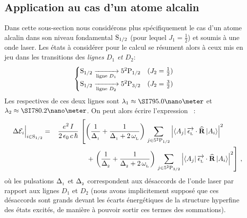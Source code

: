 \subsection{Application au cas d'un atome alcalin}
Dans cette sous-section nous considérons plus spécifiquement 
le cas d'un atome alcalin dans son niveau fondamental ${{{\rm S}_{{1}/{2}}}}$ (pour lequel $J_1=\tfrac{1}{2}$) et soumis à une onde laser.
Les états à considérer pour le calcul se résument alors à ceux mis en jeu dans les transitions des \emph{lignes $D_1$ et $D_2$}:
\[
\begin{cases}
{\ensuremath{{\rm S}_{{1}/{2}}}}\xrightarrow[\text{ligne $D_1$}]{}{5^2 {\rm P}_{{1}/{2}}} 
 \text{~~ ($J_2=\tfrac{1}{2}$)} 
 \\
{{\rm S}_{{1}/{2}}}\xrightarrow[\text{ligne $D_2$}]{}{5^2 {\rm P}_{{3}/{2}}} 
 \text{~~ ($J_2=\tfrac{3}{2}$)} 
\end{cases}
\]
Les \los respectives de ces deux lignes sont $\LO_1\approx\nm{795.0}$ et $\LO_2\approx\nm{780.2}$. 
On peut alors écrire l'expression~ :
\[
\begin{split}
	\Avec{\Delta \Ener_i}{i \in \OrbitalSJ} = \,\,\,\,\,
	\frac{e^2\,I}{2\,\epsilon_0\,c\,\hbar}\,
	&\left[
	\left(\dfrac{1
	}{\desacU}
	+\dfrac{1
	}{\desacU + 2\,\pulsLaser}
	\right)
	\,\sum_{j \in \OrbitalPJun} 
	\Module{\BraOpKet{A_j}{\Polarisation\cdot\OperR}{A_i}}^2 \right. \\
	&\,\,\,\,\,\,+ 
	\left.
	\left(\dfrac{1
	}{\desacD}
	+\dfrac{1
	}{\desacD + 2\,\pulsLaser}
	\right)
	\,\sum_{j \in \OrbitalPJdeux} 
	\Module{\BraOpKet{A_j}{\Polarisation\cdot\OperR}{A_i}}^2
	\right]
\virguleformule
\end{split}
\]
où les pulsations ${\Delta_{_{1}}}$ et ${\Delta_{_{2}}}$ correspondent aux désaccords de l'onde laser par rapport aux lignes $D_1$ et $D_2$ (nous avons implicitement supposé que ces désaccords sont grands devant les écarts énergétiques de la structure hyperfine des états excités, de manière à pouvoir sortir ces termes des sommations).

